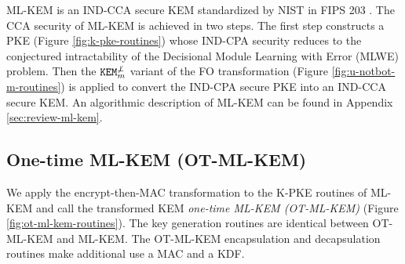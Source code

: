 \documentclass[letterpaper,12pt,titlepage,oneside,final]{book}
\newcommand{\kem}{\texttt{KEM}}
\begin{document}
ML-KEM is an IND-CCA secure KEM standardized by NIST in FIPS 203 \cite{FIPS203}.
The CCA security of ML-KEM is achieved in two steps.
The first step constructs a PKE (Figure \ref{fig:k-pke-routines}) whose IND-CPA security reduces to the conjectured intractability of the Decisional Module Learning with Error (MLWE) problem.
Then the $\kem^{\not\bot}_m$ variant of the FO transformation (Figure \ref{fig:u-notbot-m-routines}) is applied to convert the IND-CPA secure PKE into an IND-CCA secure KEM.
An algorithmic description of ML-KEM can be found in Appendix \ref{sec:review-ml-kem}.

\subsection{One-time ML-KEM (OT-ML-KEM)}\label{sec:ot-ml-kem}
We apply the encrypt-then-MAC transformation to the K-PKE routines of ML-KEM and call the transformed KEM \emph{one-time ML-KEM (OT-ML-KEM)} (Figure \ref{fig:ot-ml-kem-routines}).
The key generation routines are identical between OT-ML-KEM and ML-KEM. The OT-ML-KEM encapsulation and decapsulation routines make additional use a MAC and a KDF.
\end{document}
